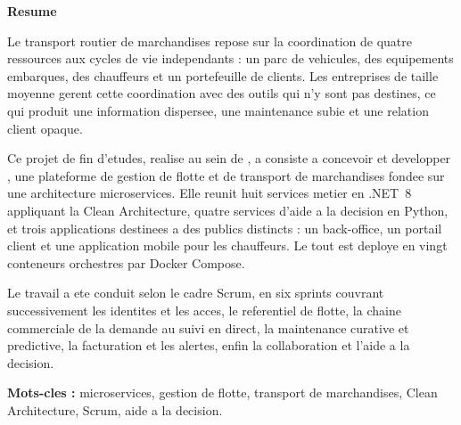 \cleardoublepage
{}
{}
\vspace*{1cm}

\begin{center}
  {\Large\sffamily\bfseries\color{noirTitre} Resume\par}
\end{center}
\vspace{0.5cm}

Le transport routier de marchandises repose sur la coordination de
quatre ressources aux cycles de vie independants : un parc de vehicules,
des equipements embarques, des chauffeurs et un portefeuille de clients.
Les entreprises de taille moyenne gerent cette coordination avec des
outils qui n'y sont pas destines, ce qui produit une information
dispersee, une maintenance subie et une relation client opaque.

Ce projet de fin d'etudes, realise au sein de \entreprise, a consiste a
concevoir et developper \sujetCourt, une plateforme de gestion de flotte
et de transport de marchandises fondee sur une architecture
microservices. Elle reunit huit services metier en .NET~8 appliquant la
Clean Architecture, quatre services d'aide a la decision en Python, et
trois applications destinees a des publics distincts : un back-office, un
portail client et une application mobile pour les chauffeurs. Le tout est
deploye en vingt conteneurs orchestres par Docker Compose.

Le travail a ete conduit selon le cadre Scrum, en six sprints couvrant
successivement les identites et les acces, le referentiel de flotte, la
chaine commerciale de la demande au suivi en direct, la maintenance
curative et predictive, la facturation et les alertes, enfin la
collaboration et l'aide a la decision.

\vspace{0.4cm}
\noindent
\textbf{Mots-cles :} microservices, gestion de flotte, transport de
marchandises, Clean Architecture, Scrum, aide a la decision.

